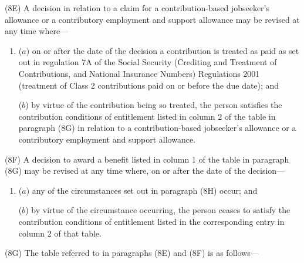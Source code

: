 \documentclass[12pt,a4paper]{article}
\begin{document}
(8E) A decision in relation to a claim for a contribution-based jobseeker’s allowance or a contributory employment and support allowance may be revised at any time where—
\begin{enumerate}\item[]
($a$) on or after the date of the decision a contribution is treated as paid as set out in regulation 7A of the Social Security (Crediting and Treatment of Contributions, and National Insurance Numbers) Regulations 2001 (treatment of Class 2 contributions paid on or before the due date); and

($b$) by virtue of the contribution being so treated, the person satisfies the contribution conditions of entitlement listed in column 2 of the table in paragraph (8G) in relation to a contribution-based jobseeker’s allowance or a contributory employment and support allowance.
\end{enumerate}

(8F) A decision to award a benefit listed in column 1 of the table in paragraph (8G) may be revised at any time where, on or after the date of the decision—
\begin{enumerate}\item[]
($a$) any of the circumstances set out in paragraph (8H) occur; and

($b$) by virtue of the circumstance occurring, the person ceases to satisfy the contribution conditions of entitlement listed in the corresponding entry in column 2 of that table.
\end{enumerate}

(8G) The table referred to in paragraphs (8E) and (8F) is as follows—
\end{document}
